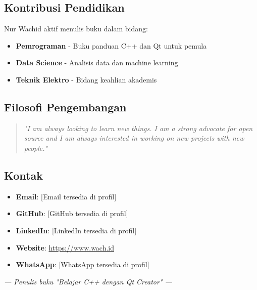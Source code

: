 \subsection*{Kontribusi Pendidikan}

Nur Wachid aktif menulis buku dalam bidang:
\begin{itemize}
\item \textbf{Pemrograman} - Buku panduan C++ dan Qt untuk pemula
\item \textbf{Data Science} - Analisis data dan machine learning
\item \textbf{Teknik Elektro} - Bidang keahlian akademis
\end{itemize}

\subsection*{Filosofi Pengembangan}

\begin{quote}
\textit{"I am always looking to learn new things. I am a strong advocate for open source and I am always interested in working on new projects with new people."}
\end{quote}

\subsection*{Kontak}

\begin{itemize}
\item \textbf{Email}: [Email tersedia di profil]
\item \textbf{GitHub}: [GitHub tersedia di profil]
\item \textbf{LinkedIn}: [LinkedIn tersedia di profil]
\item \textbf{Website}: \url{https://www.wach.id}
\item \textbf{WhatsApp}: [WhatsApp tersedia di profil]
\end{itemize}

\vspace{1cm}

\begin{center}
\textit{--- Penulis buku "Belajar C++ dengan Qt Creator" ---}
\end{center}